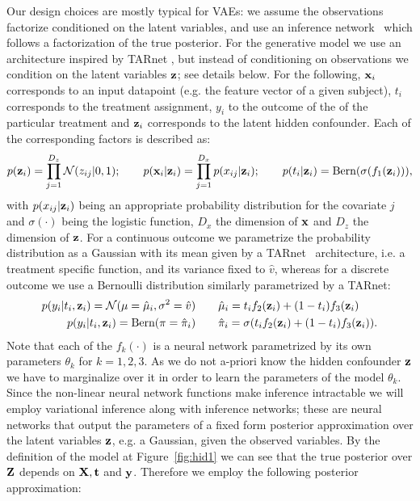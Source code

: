 Our design choices are mostly typical for VAEs: we assume the observations factorize conditioned on the latent variables, and use an inference network~\citep{kingma2013auto,rezende2014stochastic} which follows a factorization of the true posterior. For the generative model we use an architecture inspired by TARnet \citep{shalit2016estimating}, but instead of conditioning on observations we condition on the latent variables $\mathbf{z}$; see details below.
For the following, $\mathbf{x}_i$ corresponds to an input datapoint (e.g. the feature vector of a given subject), $t_i$ corresponds to the treatment assignment, $y_i$ to the outcome of the of the particular treatment and $\mathbf{z}_i$ corresponds to the latent hidden confounder. Each of the corresponding factors is described as:
\begin{align}
p(\mathbf{z}_i) = \prod_{j=1}^{D_z}\mathcal{N}(z_{ij}| 0, 1);\qquad
p(\mathbf{x}_i|\mathbf{z}_i) = \prod_{j=1}^{D_x}p(x_{ij}| \mathbf{z}_i);\qquad
p(t_i|\mathbf{z}_i) = \text{Bern}(\sigma(f_1(\mathbf{z}_i))),
\end{align}
with $p(x_{ij}|\mathbf{z}_i)$ being an appropriate probability distribution for the covariate $j$ and $\sigma(\cdot)$ being the logistic function, $D_x$ the dimension of $\mathbf{x}$ and $D_z$ the dimension of $\mathbf{z}$. For a continuous outcome we parametrize the probability distribution as a Gaussian with its mean given by a TARnet~\citep{shalit2016estimating} architecture, i.e. a treatment specific function, and its variance fixed to $\hat{v}$, whereas for a discrete outcome we use a Bernoulli distribution similarly parametrized by a TARnet:
\begin{align}
p(y_i|t_i, \mathbf{z}_i) = \mathcal{N}(\mu=\hat{\mu}_i, \sigma^2=\hat{v})&\qquad
\hat{\mu}_i = t_i f_2(\mathbf{z}_i) + (1 - t_i)f_3(\mathbf{z}_i)\\
p(y_i|t_i, \mathbf{z}_i) = \text{Bern}(\pi=\hat{\pi}_i)&\qquad
\hat{\pi}_i = \sigma(t_i f_2(\mathbf{z}_i) + (1 - t_i)f_3(\mathbf{z}_i)).
\end{align}
Note that each of the $f_k(\cdot)$ is a neural network parametrized by its own parameters $\theta_k$ for $k=1,2,3$. As we do not a-priori know the hidden confounder $\mathbf{z}$ we have to marginalize over it in order to learn the parameters of the model $\theta_k$. Since the non-linear neural network functions make inference intractable we will employ variational inference along with inference networks; these are neural networks that output the parameters of a fixed form posterior approximation over the latent variables $\mathbf{z}$, e.g. a Gaussian, given the observed variables. By the definition of the model at Figure~\ref{fig:hid1} we can see that the true posterior over $\mathbf{Z}$ depends on $\mathbf{X},\mathbf{t}$ and $\mathbf{y}$. Therefore we employ the following posterior approximation:
